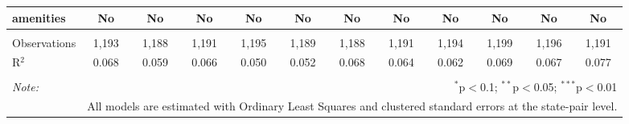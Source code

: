 \documentclass[12pt,a4paper]{article}
\begin{document}
\begin{landscape}
\begin{table}[!htbp]
\begin{tabular}{@{\extracolsep{5pt}}lccccccccccc}
amenities & No & No & No & No & No & No & No & No & No & No & No \\ 
\hline \\[-1.8ex] 
Observations & 1,193 & 1,188 & 1,191 & 1,195 & 1,189 & 1,188 & 1,191 & 1,194 & 1,199 & 1,196 & 1,191 \\ 
R$^{2}$ & 0.068 & 0.059 & 0.066 & 0.050 & 0.052 & 0.068 & 0.064 & 0.062 & 0.069 & 0.067 & 0.077 \\ 
\hline 
\hline \\[-1.8ex] 
\textit{Note:}  & \multicolumn{11}{r}{$^{*}$p$<$0.1; $^{**}$p$<$0.05; $^{***}$p$<$0.01} \\ 
 & \multicolumn{11}{r}{All models are estimated with Ordinary Least Squares and clustered standard errors at the state-pair level.} \\ 
\end{tabular} 
\end{table}
\end{landscape}
\restoregeometry

\begin{landscape}

\end{landscape}
\restoregeometry
\end{document}
